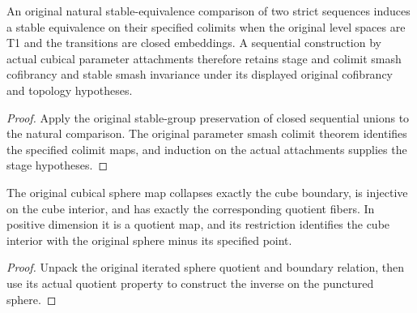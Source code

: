 \begin{proposition}
  \label{prop:actual-smash-parameter-cell-sequences}
  \leanok
  An original natural stable-equivalence comparison of two strict sequences induces a stable equivalence on their specified colimits when the original level spaces are T1 and the transitions are closed embeddings. A sequential construction by actual cubical parameter attachments therefore retains stage and colimit smash cofibrancy and stable smash invariance under its displayed original cofibrancy and topology hypotheses.
\end{proposition}
\begin{proof}
  Apply the original stable-group preservation of closed sequential unions to the natural comparison. The original parameter smash colimit theorem identifies the specified colimit maps, and induction on the actual attachments supplies the stage hypotheses.
  \leanok
\end{proof}

\begin{proposition}
  \label{prop:actual-sphere-cube-interior}
  \leanok
  The original cubical sphere map collapses exactly the cube boundary, is injective on the cube interior, and has exactly the corresponding quotient fibers. In positive dimension it is a quotient map, and its restriction identifies the cube interior with the original sphere minus its specified point.
\end{proposition}
\begin{proof}
  Unpack the original iterated sphere quotient and boundary relation, then use its actual quotient property to construct the inverse on the punctured sphere.
  \leanok
\end{proof}

